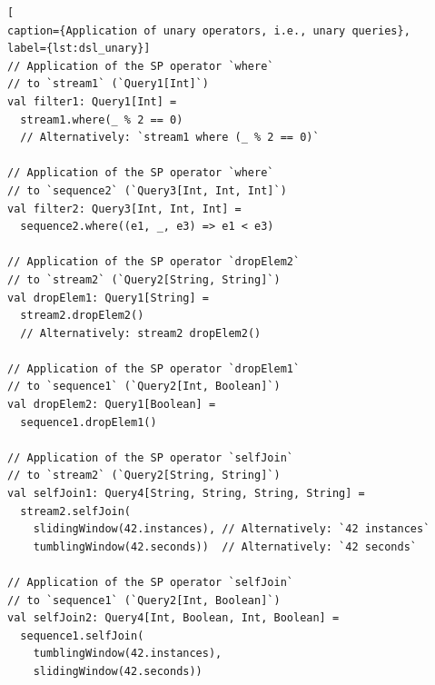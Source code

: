 \documentclass[article, 10pt, type=bsc, colorback, accentcolor=tud8b, parskip=half, bibliography=totocnumbered]{tudthesis}
\begin{document}
\begin{lstlisting}[
caption={Application of unary operators, i.e., unary queries},
label={lst:dsl_unary}]
// Application of the SP operator `where`
// to `stream1` (`Query1[Int]`)
val filter1: Query1[Int] =
  stream1.where(_ % 2 == 0)
  // Alternatively: `stream1 where (_ % 2 == 0)`

// Application of the SP operator `where`
// to `sequence2` (`Query3[Int, Int, Int]`)
val filter2: Query3[Int, Int, Int] =
  sequence2.where((e1, _, e3) => e1 < e3)

// Application of the SP operator `dropElem2`
// to `stream2` (`Query2[String, String]`)
val dropElem1: Query1[String] =
  stream2.dropElem2()
  // Alternatively: stream2 dropElem2()

// Application of the SP operator `dropElem1`
// to `sequence1` (`Query2[Int, Boolean]`)
val dropElem2: Query1[Boolean] =
  sequence1.dropElem1()

// Application of the SP operator `selfJoin`
// to `stream2` (`Query2[String, String]`)
val selfJoin1: Query4[String, String, String, String] =
  stream2.selfJoin(
    slidingWindow(42.instances), // Alternatively: `42 instances`
    tumblingWindow(42.seconds))  // Alternatively: `42 seconds`

// Application of the SP operator `selfJoin`
// to `sequence1` (`Query2[Int, Boolean]`)
val selfJoin2: Query4[Int, Boolean, Int, Boolean] =
  sequence1.selfJoin(
    tumblingWindow(42.instances),
    slidingWindow(42.seconds))
\end{lstlisting}
\end{document}
